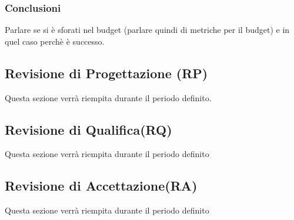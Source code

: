\subsubsection{Conclusioni}
Parlare se si è sforati nel budget (parlare quindi di metriche per il budget) e in quel caso perchè è successo.
\clearpage
\subsection{Revisione di Progettazione (RP)}
Questa sezione verrà riempita durante il periodo definito.
\subsection{Revisione di Qualifica(RQ)}
Questa sezione verrà riempita durante il periodo definito
\subsection{Revisione di Accettazione(RA)}
Questa sezione verrà riempita durante il periodo definito